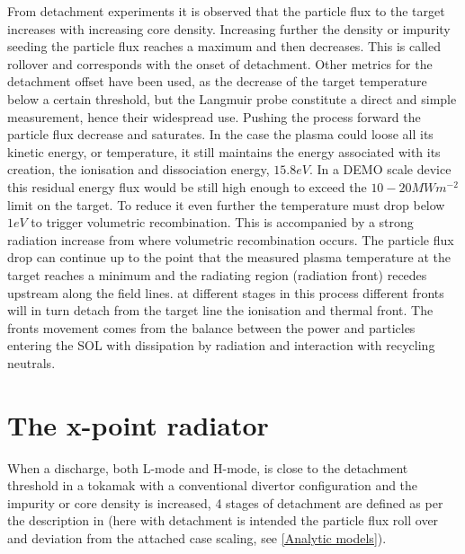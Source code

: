 From detachment experiments it is observed that the particle flux to the target increases with increasing core density. Increasing further the density or impurity seeding the particle flux reaches a maximum and then decreases. This is called rollover and corresponds with the onset of detachment. Other metrics for the detachment offset have been used, as the decrease of the target temperature below a certain threshold\cite{Stangeby2000,Goldston2017}, but the Langmuir probe constitute a direct and simple measurement, hence their widespread use. Pushing the process forward the particle flux decrease and saturates. In the case the plasma could loose all its kinetic energy, or temperature, it still maintains the energy associated with its creation, the ionisation and dissociation energy, $15.8eV$. In a DEMO scale device this residual energy flux would be still high enough to exceed the $10-20 MWm^{-2}$ limit on the target. \cite{Krasheninnikov2017a} To reduce it even further the temperature must drop below $1eV$ to trigger volumetric recombination. This is accompanied by a strong radiation increase from where volumetric recombination occurs. The particle flux drop can continue up to the point that the measured plasma temperature at the target reaches a minimum and the radiating region (radiation front) recedes upstream along the field lines.\cite{Krasheninnikov1999} at different stages in this process different fronts will in turn detach from the target line the ionisation and thermal front.\cite{Hutchinson1994,Loarte1998,Lipschultz2016} The fronts movement comes from the balance between the power and particles entering the SOL with dissipation by radiation and interaction with recycling neutrals.




\section{The x-point radiator}\label{The x-point radiator}

When a discharge, both L-mode and H-mode, is close to the detachment threshold in a tokamak with a conventional divertor configuration and the impurity or core density is increased, 4 stages of detachment are defined as per the description in \cite{Reimold2015,Potzel2014} (here with detachment is intended the particle flux roll over and deviation from the attached case scaling, see \autoref{Analytic models}).

